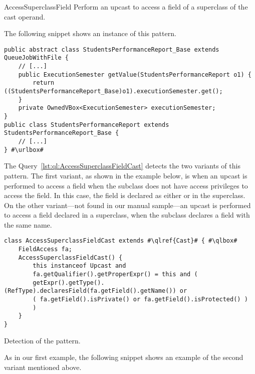 \begin{pattern}{AccessSuperclassField}
Perform an upcast to access a field of a superclass of the cast operand.

\instancesgen{}
The following snippet shows an instance of this pattern.

\def\urlvar{http://bit.ly/FenixEdu_fenixedu_academic_2SQxlkC}
\begin{verbatim}
public abstract class StudentsPerformanceReport_Base extends QueueJobWithFile {
    // [...]
    public ExecutionSemester getValue(StudentsPerformanceReport o1) {
        return ((StudentsPerformanceReport_Base)o1).executionSemester.get();
    }
    private OwnedVBox<ExecutionSemester> executionSemester;
}
public class StudentsPerformanceReport extends StudentsPerformanceReport_Base {
    // [...]
} #\urlbox#
\end{verbatim}


\detection{}
The Query~\ref{lst:ql:AccessSuperclassFieldCast} detects the two variants of this pattern.
The first variant, as shown in the example below, is when an upcast is performed to access a field when the subclass does not have access privileges to access the field.
In this case, the field is declared as either  or  in the superclass.
On the other variant---not found in our manual sample---an upcast is performed to access a field declared in a superclass,
when the subclass declares a field with the same name.

\begin{listing}
\begin{verbatim}
class AccessSuperclassFieldCast extends #\qlref{Cast}# { #\qlbox#
	FieldAccess fa;
	AccessSuperclassFieldCast() {
		this instanceof Upcast and
		fa.getQualifier().getProperExpr() = this and (
		getExpr().getType().(RefType).declaresField(fa.getField().getName()) or
		( fa.getField().isPrivate() or fa.getField().isProtected() )
		)
	}
}
\end{verbatim}
\caption{Detection of the \thisp{} pattern.}
\label{lst:ql:AccessSuperclassFieldCast}
\end{listing}

As in our first example,
the following snippet shows an example of the second variant mentioned above.


\end{pattern}
